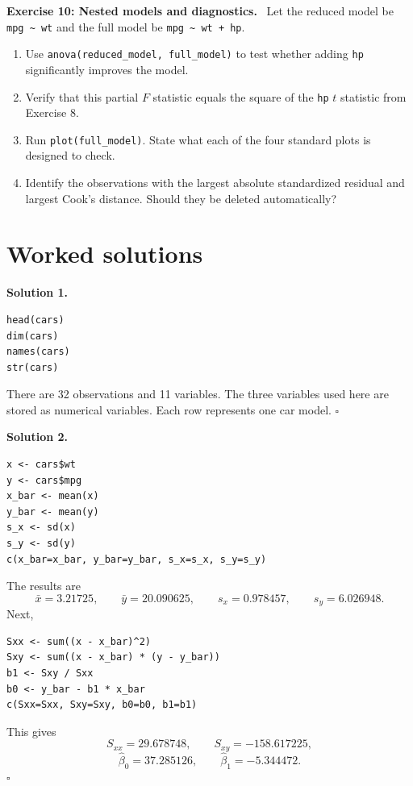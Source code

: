 \documentclass[11pt]{article}
\newenvironment{exercise}[1]
 {\par\medskip\noindent\color{navy}\textbf{Exercise #1.}\color{black}\ }
 {\par\medskip}
\newenvironment{answer}[1]
 {\par\medskip\noindent\color{green}\textbf{Solution #1.}\color{black}\ }
 {\hfill$\square$\par\medskip}
\begin{document}
\begin{exercise}{10: Nested models and diagnostics}
Let the reduced model be \texttt{mpg \textasciitilde{} wt} and the full model
be \texttt{mpg \textasciitilde{} wt + hp}.
\begin{enumerate}[label=(\alph*),leftmargin=*]
 \item Use \texttt{anova(reduced\_model, full\_model)} to test whether adding
 \texttt{hp} significantly improves the model.
 \item Verify that this partial $F$ statistic equals the square of the
 \texttt{hp} $t$ statistic from Exercise 8.
 \item Run \texttt{plot(full\_model)}. State what each of the four standard
 plots is designed to check.
 \item Identify the observations with the largest absolute standardized
 residual and largest Cook's distance. Should they be deleted automatically?
\end{enumerate}
\end{exercise}

\newpage
\section{Worked solutions}

\begin{answer}{1}
\begin{lstlisting}
head(cars)
dim(cars)
names(cars)
str(cars)
\end{lstlisting}
There are 32 observations and 11 variables. The three variables used here are
stored as numerical variables. Each row represents one car model.
\end{answer}

\begin{answer}{2}
\begin{lstlisting}
x <- cars$wt
y <- cars$mpg
x_bar <- mean(x)
y_bar <- mean(y)
s_x <- sd(x)
s_y <- sd(y)
c(x_bar=x_bar, y_bar=y_bar, s_x=s_x, s_y=s_y)
\end{lstlisting}
The results are
\[
 \bar x=3.21725,
 \qquad \bar y=20.090625,
 \qquad s_x=0.978457,
 \qquad s_y=6.026948.
\]
Next,
\begin{lstlisting}
Sxx <- sum((x - x_bar)^2)
Sxy <- sum((x - x_bar) * (y - y_bar))
b1 <- Sxy / Sxx
b0 <- y_bar - b1 * x_bar
c(Sxx=Sxx, Sxy=Sxy, b0=b0, b1=b1)
\end{lstlisting}
This gives
\[
 S_{xx}=29.678748,
 \qquad S_{xy}=-158.617225,
\]
\[
 \widehat\beta_0=37.285126,
 \qquad \widehat\beta_1=-5.344472.
\]
\end{answer}
\end{document}
